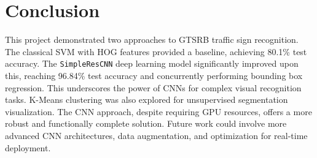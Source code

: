 \documentclass[11pt, a4paper]{article}
\begin{document}
\section{Conclusion}
This project demonstrated two approaches to GTSRB traffic sign recognition. The classical SVM with HOG features provided a baseline, achieving 80.1\% test accuracy. The \texttt{SimpleResCNN} deep learning model significantly improved upon this, reaching 96.84\% test accuracy and concurrently performing bounding box regression. This underscores the power of CNNs for complex visual recognition tasks. K-Means clustering was also explored for unsupervised segmentation visualization. The CNN approach, despite requiring GPU resources, offers a more robust and functionally complete solution. Future work could involve more advanced CNN architectures, data augmentation, and optimization for real-time deployment.
\end{document}
